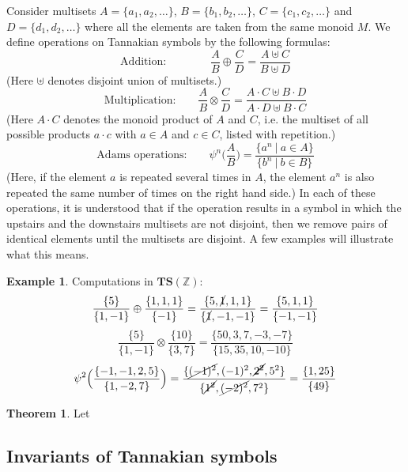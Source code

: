 \documentclass[a4paper]{article}
\theoremstyle{definition}
\newtheorem{theorem}{Theorem}[section]
\newtheorem{example}{Example}[section]
\theoremstyle{remark}
\begin{document}
Consider multisets $A = \{a_1, a_2, \ldots\}$, $B = \{b_1, b_2, \ldots\}$, $C = \{c_1, c_2, \ldots\}$ and $D = \{ d_1, d_2, \ldots \}$ where all the elements are taken from the same monoid $M$. We define operations on Tannakian symbols by the following formulas:
$$ \textrm{Addition:} \qquad \qquad \frac{A}{B} \oplus \frac{C}{D} = \frac{A \uplus C}{B \uplus D}  $$
(Here $\uplus$ denotes disjoint union of multisets.)
$$ \textrm{Multiplication:} \qquad \frac{A}{B} \otimes \frac{C}{D} = \frac{ A \cdot C \uplus B \cdot D }{ A \cdot D \uplus B \cdot C }  $$
(Here $A \cdot C$ denotes the monoid product of $A$ and $C$, i.e. the multiset of all possible products $a \cdot c$ with $a \in A$ and $c \in C$, listed with repetition.)
$$  \textrm{Adams operations:} \qquad \psi^n \Big( \frac{A}{B} \Big) = \frac{\{a^n \ \vert \ a \in A \}}{\{b^n \ \vert \ b \in B \}}    $$ 
(Here, if the element $a$ is repeated several times in $A$, the element $a^n$ is also repeated the same number of times on the right hand side.)
In each of these operations, it is understood that if the operation results in a symbol in which the upstairs and the downstairs multisets are not disjoint, then we remove pairs of identical elements until the multisets are disjoint. A few examples will illustrate what this means.
\begin{example} Computations in $\mathbf{TS}(\mathbb{Z})$:
$$\frac{ \{ 5\} }{ \{ 1, -1 \} } \oplus \frac{  \{ 1, 1, 1 \}  }{  \{ -1 \}  } = \frac{  \{ 5, \cancel{1}, 1, 1 \}   }{  \{ \cancel{1}, -1, -1 \} } = \frac{  \{ 5, 1, 1 \}   }{  \{  -1, -1 \} } $$
$$\frac{ \{ 5\} }{ \{ 1, -1 \} } \otimes \frac{ \{ 10 \} }{  \{ 3, 7 \}  } = \frac{  \{ 50, 3, 7, -3, -7 \}   }{  \{ 15, 35, 10, -10 \} }  $$
$$ \psi^2 \Big( \frac{ \{  -1, -1, 2, 5 \} }{ \{  1, -2, 7\} } \Big) =  \frac{ \{  \cancel{(-1)^2}, (-1)^2, \cancel{2^2}, 5^2 \} }{ \{  \cancel{1^2}, \cancel{(-2)^2}, 7^2 \} } = \frac{ \{  1, 25 \} }{ \{  49 \} } $$
\end{example}


\begin{theorem}
Let 
\end{theorem}



\subsection{Invariants of Tannakian symbols}
\end{document}
